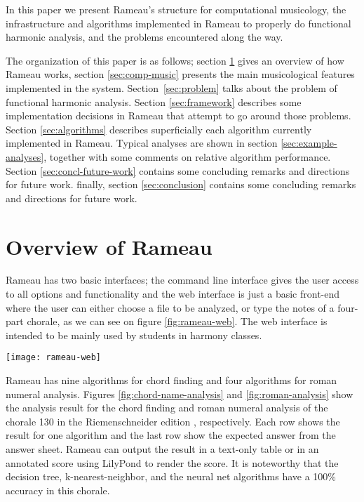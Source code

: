 In this paper we present Rameau's structure for computational
musicology, the infrastructure and algorithms implemented in Rameau to
properly do functional harmonic analysis, and the problems encountered
along the way.

The organization of this paper is as follows; section \ref{sec:system}
gives an overview of how Rameau works, section \ref{sec:comp-music}
presents the main musicological features implemented in the
system. Section~\ref{sec:problem} talks about the problem of
functional harmonic analysis. Section \ref{sec:framework} describes
some implementation decisions in Rameau that attempt to go around
those problems.  Section \ref{sec:algorithms} describes superficially
each algorithm currently implemented in Rameau. Typical analyses are
shown in section \ref{sec:example-analyses}, together with some
comments on relative algorithm performance. Section
\ref{sec:concl-future-work} contains some concluding remarks and
directions for future work. finally, section \ref{sec:conclusion}
contains some concluding remarks and directions for future work.

\section{Overview of Rameau}
\label{sec:system}

Rameau has two basic interfaces; the command line interface gives the
user access to all options and functionality and the web interface is
just a basic front-end where the user can either choose a file to be
analyzed, or type the notes of a four-part chorale, as we can see on
figure \ref{fig:rameau-web}. The web interface is intended to be
mainly used by students in harmony classes.

\begin{figure*}
  \centering
  \texttt{[image: rameau-web]}
  \caption{Rameau's web interface}
  \label{fig:rameau-web}
\end{figure*}

Rameau has nine algorithms for chord finding and four algorithms for
roman numeral analysis. Figures \ref{fig:chord-name-analysis} and
\ref{fig:roman-analysis} show the analysis result for the chord
finding and roman numeral analysis of the chorale 130 in the
Riemenschneider edition \cite{bach41:371} , respectively. Each row
shows the result for one algorithm and the last row show the expected
answer from the answer sheet. Rameau can output the result in a
text-only table or in an annotated score using LilyPond
\cite{nienhuys.ea08:lilypond} to render the score. It is noteworthy
that the decision tree, k-nearest-neighbor, and the neural net
algorithms have a 100\% accuracy in this chorale.

